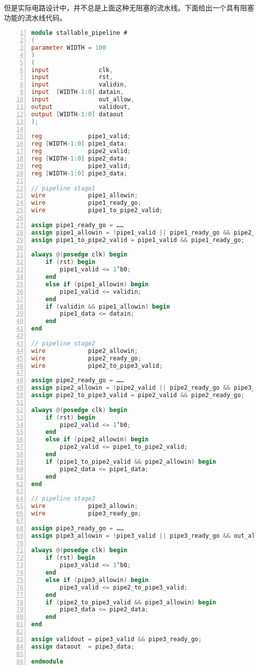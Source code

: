 但是实际电路设计中，并不总是上面这种无阻塞的流水线。下面给出一个具有阻塞功能的流水线代码。
\begin{lstlisting}[language=Verilog,label=lst:3_stage_pipeline_stall_flush,caption=有阻塞3级流水线实现,numbers=left,xleftmargin=5em,xrightmargin=5em, aboveskip=2em]
module stallable_pipeline #
(
parameter WIDTH = 100
)
(
input              clk,
input              rst,
input              validin,
input  [WIDTH-1:0] datain,
input              out_allow,
output             validout,
output [WIDTH-1:0] dataout
);

reg             pipe1_valid;
reg [WIDTH-1:0] pipe1_data;
reg             pipe2_valid;
reg [WIDTH-1:0] pipe2_data;
reg             pipe3_valid;
reg [WIDTH-1:0] pipe3_data;

// pipeline stage1
wire            pipe1_allowin;
wire            pipe1_ready_go;
wire            pipe1_to_pipe2_valid;

assign pipe1_ready_go = ……
assign pipe1_allowin = !pipe1_valid || pipe1_ready_go && pipe2_allowin;
assign pipe1_to_pipe2_valid = pipe1_valid && pipe1_ready_go;

always @(posedge clk) begin
    if (rst) begin
        pipe1_valid <= 1’b0;
    end
    else if (pipe1_allowin) begin
        pipe1_valid <= validin;
    end
    if (validin && pipe1_allowin) begin
        pipe1_data <= datain;
    end
end

// pipeline stage2
wire            pipe2_allowin;
wire            pipe2_ready_go;
wire            pipe2_to_pipe3_valid;

assign pipe2_ready_go = ……
assign pipe2_allowin = !pipe2_valid || pipe2_ready_go && pipe3_allowin;
assign pipe2_to_pipe3_valid = pipe2_valid && pipe2_ready_go;

always @(posedge clk) begin
    if (rst) begin
        pipe2_valid <= 1’b0;
    end
    else if (pipe2_allowin) begin
        pipe2_valid <= pipe1_to_pipe2_valid;
    end
    if (pipe1_to_pipe2_valid && pipe2_allowin) begin
        pipe2_data <= pipe1_data;
    end
end

// pipeline stage3
wire            pipe3_allowin;
wire            pipe3_ready_go;

assign pipe3_ready_go = ……
assign pipe3_allowin = !pipe3_valid || pipe3_ready_go && out_allow;

always @(posedge clk) begin
    if (rst) begin
        pipe3_valid <= 1’b0;
    end
    else if (pipe3_allowin) begin
        pipe3_valid <= pipe2_to_pipe3_valid;
    end
    if (pipe2_to_pipe3_valid && pipe3_allowin) begin
        pipe3_data <= pipe2_data;
    end
end

assign validout = pipe3_valid && pipe3_ready_go;
assign dataout  = pipe3_data;

endmodule
\end{lstlisting}

